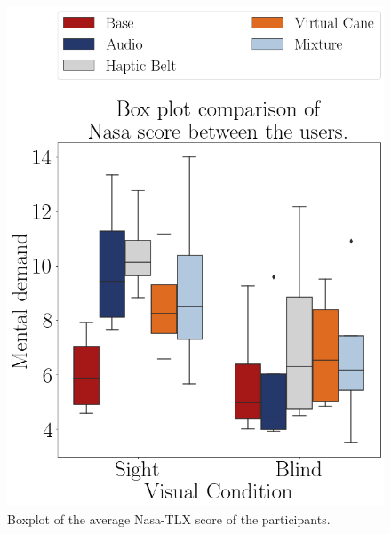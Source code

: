 \begin{figure}[!htb]
    \begin{minipage}{.45\linewidth}
        \centering
        \includegraphics[width = \linewidth]{Resultados/Nasa/Figuras/png/boxplot_nasa_avg_scene.png}
        \caption{Boxplot of the average Nasa-TLX score of the participants.}
        \label{fig:boxplot_nasa_scene}
    \end{minipage}
    \begin{minipage}{.1\linewidth}
        \hfill
    \end{minipage}
    \begin{minipage}{.45\linewidth}
        \centering
        \vspace{1.8cm}

\end{minipage}
\end{figure}
